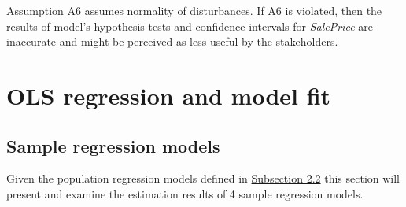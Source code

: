 \documentclass{article}
\begin{document}
Assumption A6 assumes normality of disturbances. If A6 is violated, then the results of model's hypothesis tests and confidence intervals for \emph{SalePrice} are inaccurate and might be perceived as less useful by the stakeholders.

\section{OLS regression and model fit}
\label{sec:olsfit}
\subsection{Sample regression models}

Given the population regression models defined in \hyperref[sec:hypotheses]{Subsection 2.2} this section will present and examine the estimation results of 4 sample regression models.
\end{document}
